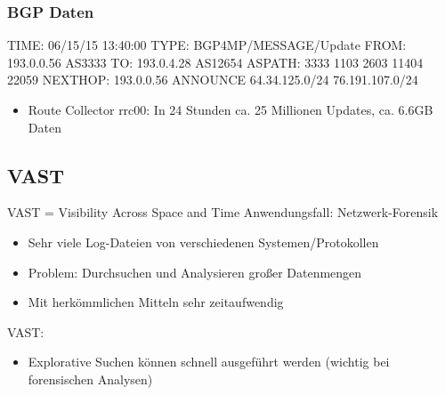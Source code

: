 \documentclass[9pt]{beamer}
\begin{document}
\begin{frame}[fragile]\frametitle{BGP Daten}
    \begin{semiverbatim}
        TIME: 06/15/15 13:40:00
        TYPE: BGP4MP/MESSAGE/Update
        FROM: 193.0.0.56 AS3333
        TO: 193.0.4.28 AS12654
        ASPATH: 3333 1103 2603 11404 22059
        NEXT\textunderscore HOP: 193.0.0.56
        ANNOUNCE
          64.34.125.0/24
            76.191.107.0/24
        \end{semiverbatim}
        \pause
        \begin{itemize}
            \item{Route Collector rrc00: In 24 Stunden ca. 25 Millionen Updates, ca. 6.6GB Daten}

        \end{itemize}
\end{frame}
\subsection{VAST}

\begin{frame}{VAST = Visibility Across Space and Time}{}
	Anwendungsfall: Netzwerk-Forensik
	\begin{itemize}
		\item Sehr viele Log-Dateien von verschiedenen Systemen/Protokollen
		\item Problem: Durchsuchen und Analysieren großer Datenmengen
		\item Mit herkömmlichen Mitteln sehr zeitaufwendig
	\end{itemize}
	VAST:
	\begin{itemize}
		\item Explorative Suchen können schnell ausgeführt werden (wichtig bei forensischen Analysen)
	\end{itemize}
\end{frame}
\end{document}
